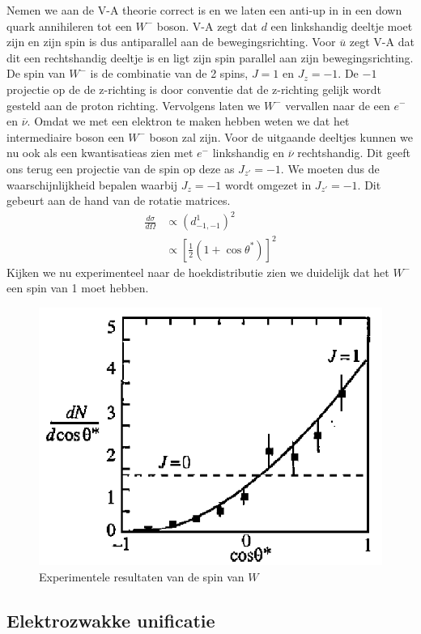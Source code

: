 \documentclass[../main.tex]{subfiles}
\begin{document}
Nemen we aan de V-A theorie correct is en we laten een anti-up in in een down quark annihileren tot een $W^-$ boson. V-A zegt dat $d$ een linkshandig deeltje moet zijn en zijn spin is dus antiparallel aan de bewegingsrichting. Voor $\overline u$ zegt V-A dat dit een rechtshandig deeltje is en ligt zijn spin parallel aan zijn bewegingsrichting. De spin van $W^-$ is de combinatie van de 2 spins, $J=1$ en $J_z=-1$. De $-1$ projectie op de de z-richting is door conventie dat de z-richting gelijk wordt gesteld aan de proton richting. Vervolgens laten we $W^-$ vervallen naar de een $e^-$ en $\overline \nu$. Omdat we met een elektron te maken hebben weten we dat het intermediaire boson een $W^-$ boson zal zijn. Voor de uitgaande deeltjes kunnen we nu ook als een kwantisatieas zien met $e^-$ linkshandig en $\overline \nu$ rechtshandig. Dit geeft ons terug een projectie van de spin op deze as $J_{z'}=-1$. We moeten dus de waarschijnlijkheid bepalen waarbij $J_z=-1$ wordt omgezet in $J_{z'}=-1$. Dit gebeurt aan de hand van de rotatie matrices.
\begin{equation}
    \begin{aligned}
        \label{eq:kans_proj_omz}
        \frac{d\sigma}{d\Omega} &\propto (d_{-1,-1}^1)^2\\
                                &\propto \left[ \frac{1}{2} (1+\cos\theta^*)\right]^2
    \end{aligned}
\end{equation}
Kijken we nu experimenteel naar de hoekdistributie zien we duidelijk dat het $W^-$ een spin van 1 moet hebben.

\begin{figure}[h]
    \centering
    \includegraphics[width=0.4\linewidth]{elektroweak_precision_tests/spin_van_w_resultaten.png}
    \caption{Experimentele resultaten van de spin van $W$}%
    \label{fig:elektroweak_precision_tests/spin_van_w_resultaten}
\end{figure}

\subsection{Elektrozwakke unificatie}%
\label{sub:elektrozwakke_unificatie}
\end{document}
